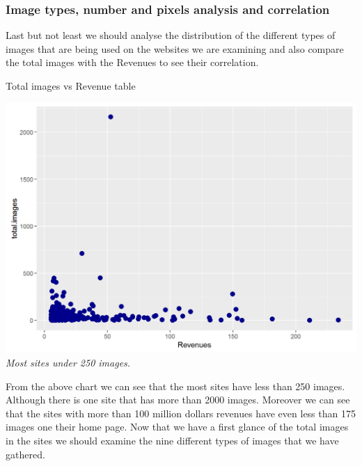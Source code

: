 \documentclass{book}
\begin{document}
\subsubsection{Image types, number and pixels analysis and correlation}
Last but not least we should analyse the distribution of the different types of images that are being used on the websites we are examining and also compare the total images with the Revenues to see their correlation.
\begin{table}[H]
\centering
\caption{Total images vs Revenue table}
\begin{center}
\includegraphics[scale=0.5]{../R/photos/53_timg_rev.png}    \\
\textit{Most sites under 250 images.}
\end{center}
\end{table}
From the above chart we can see that the most sites have less than 250 images. Although there is one site that has more than 2000 images. Moreover we can see that the sites with more than 100 million dollars revenues have even less than 175 images one their home page. Now that we have a first glance of the total images in the sites we should examine the nine different types of images that we have gathered.
\end{document}
